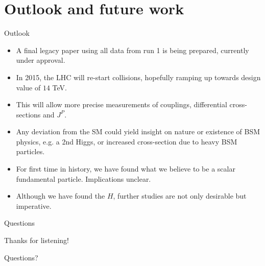 \documentclass{beamer}
\begin{document}
\section{Outlook and future work}

\begin{frame}{Outlook}

  \begin{itemize}
  \item A final legacy paper using all data from run 1 is being prepared, currently under approval.
 \pause \item In 2015, the LHC will re-start collisions, hopefully ramping up towards design value of $14$ TeV.
\pause  \item This will allow more precise measurements of couplings, differential cross-sections and $J^P$.
\pause  \item Any deviation from the SM could yield insight on nature or existence of BSM physics, e.g. a 2nd Higgs, or increased cross-section due to heavy BSM particles.
\pause  \item For first time in history, we have found what we believe to be a scalar fundamental particle. Implications unclear.
 \pause \item Although we have found the $H$, further studies are not only desirable but imperative.
 
  \end{itemize}
 
\end{frame}
\begin{frame}{Questions}
\begin{center}
{\Large Thanks for listening! 

Questions?}
\end{center}
\end{frame}
\end{document}
